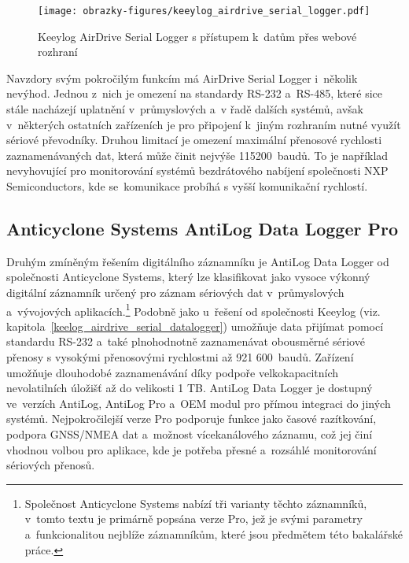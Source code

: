 \newpage

\begin{figure}[h]
    \centering
    \texttt{[image: obrazky-figures/keeylog\_airdrive\_serial\_logger.pdf]}
    
    \caption{Keeylog AirDrive Serial Logger s přístupem k~datům přes webové rozhraní~\cite{keelog_airdrive_serial_datalogger, keelog_airdrive_serial_datalogger_scheme}}
    \label{fig:keelog-airdrive-serial-datalogger}
\end{figure}

Navzdory svým pokročilým funkcím má AirDrive Serial Logger i~několik nevýhod. Jednou z~nich je omezení na standardy RS-232 a~RS-485, které sice stále nacházejí uplatnění v~průmyslových a~v řadě dalších systémů, avšak v~některých ostatních zařízeních je pro připojení k~jiným rozhraním nutné využít sériové převodníky. Druhou limitací je omezení maximální přenosové rychlosti zaznamenávaných dat, která může činit nejvýše 115200~baudů. To je například nevyhovující pro monitorování systémů bezdrátového nabíjení společnosti NXP Semiconductors, kde se~komunikace probíhá s vyšší komunikační rychlostí.~\cite{keelog_airdrive_serial_datalogger}

\newpage

\subsection{Anticyclone Systems AntiLog Data Logger Pro}
\label{anticyclone_systems_antilog_data_logger}
Druhým zmíněným řešením digitálního záznamníku je AntiLog Data Logger od společnosti Anticyclone Systems, který lze klasifikovat jako vysoce výkonný digitální záznamník určený pro záznam sériových dat v~průmyslových a~vývojových aplikacích.\footnote{Společnost Anticyclone Systems nabízí tři varianty těchto záznamníků, v~tomto textu je primárně popsána verze Pro, jež je svými parametry a~funkcionalitou nejblíže záznamníkům, které jsou předmětem této bakalářské práce.} Podobně jako u~řešení od společnosti Keeylog (viz. kapitola~\ref{keelog_airdrive_serial_datalogger}) umožňuje data přijímat pomocí standardu RS-232 a~také plnohodnotně zaznamenávat obousměrné sériové přenosy s vysokými přenosovými rychlostmi až 921 600~baudů. Zařízení umožňuje dlouhodobé zaznamenávání díky podpoře velkokapacitních nevolatilních úložišť až do velikosti 1 TB. AntiLog Data Logger je dostupný ve~verzích AntiLog, AntiLog Pro a~OEM modul pro přímou integraci do jiných systémů. Nejpokročilejší verze Pro podporuje funkce jako časové razítkování, podpora GNSS/NMEA dat a~možnost vícekanálového záznamu, což jej činí vhodnou volbou pro aplikace, kde je potřeba přesné a~rozsáhlé monitorování sériových přenosů.~\cite{anticyclone_systems_antilog_pro}

